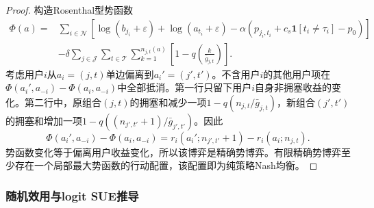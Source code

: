 \documentclass[UTF8,11pt]{ctexart}
\newcommand{\qos}{q}
\newcommand{\T}{\mathcal{T}}
\newcommand{\J}{\mathcal{J}}
\newcommand{\N}{\mathcal{N}}
\begin{document}
\begin{proof}
构造Rosenthal型势函数
\begin{align}
  \Phi(a)=
  &\sum_{i\in\N}
  \left[\log(b_{j_i}+\varepsilon)+\log(a_{t_i}+\varepsilon)
  -\alpha\left(p_{j_i,t_i}+c_s\mathbf{1}[t_i\ne \tau_i]-p_0\right)\right] \nonumber\\
  &-\delta\sum_{j\in\J}\sum_{t\in\T}
  \sum_{k=1}^{n_{j,t}(a)}
  \left[1-\qos\!\left(\frac{k}{\bar g_{j,t}}\right)\right].
  \label{eq:potential}
\end{align}
考虑用户$i$从$a_i=(j,t)$单边偏离到$a_i'=(j',t')$。不含用户$i$的其他用户项在$\Phi(a_i',a_{-i})-\Phi(a_i,a_{-i})$中全部抵消。第一行只留下用户$i$自身非拥塞收益的变化。第二行中，原组合$(j,t)$的拥塞和减少一项$1-\qos(n_{j,t}/\bar g_{j,t})$，新组合$(j',t')$的拥塞和增加一项$1-\qos((n_{j',t'}+1)/\bar g_{j',t'})$。因此
\[
\Phi(a_i',a_{-i})-\Phi(a_i,a_{-i})
=r_i(a_i';n_{j',t'}+1)-r_i(a_i;n_{j,t}).
\]
势函数变化等于偏离用户收益变化，所以该博弈是精确势博弈。有限精确势博弈至少存在一个局部最大势函数的行动配置，该配置即为纯策略Nash均衡\cite{rosenthal1973class,monderer1996potential}。
\end{proof}

\subsubsection{随机效用与logit SUE推导}
\end{document}
